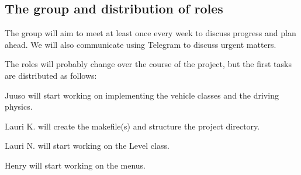 \documentclass{article}
\begin{document}
\subsection*{The group and distribution of roles}
The group will aim to meet at least once every week to discuss progress and plan ahead. We will also communicate using Telegram to discuss urgent matters.

The roles will probably change over the course of the project, but the first tasks are distributed as follows:

Juuso will start working on implementing the vehicle classes and the driving physics.

Lauri K. will create the makefile(s) and structure the project directory.

Lauri N. will start working on the Level class.

Henry will start working on the menus.
\end{document}
